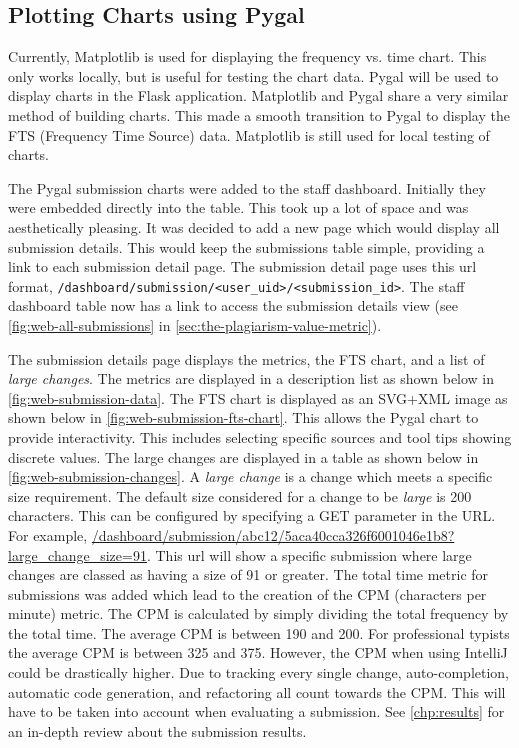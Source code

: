 \subsection{Plotting Charts using Pygal}
Currently, Matplotlib is used for displaying the frequency vs. time chart. This only works locally, but is useful for testing the chart data. Pygal will be used to display charts in the Flask application\cite{PygalFlask}. Matplotlib and Pygal share a very similar method of building charts. This made a smooth transition to Pygal to display the FTS (Frequency Time Source) data. Matplotlib is still used for local testing of charts.

The Pygal submission charts were added to the staff dashboard. Initially they were embedded directly into the table. This took up a lot of space and was aesthetically pleasing. It was decided to add a new page which would display all submission details. This would keep the submissions table simple, providing a link to each submission detail page. The submission detail page uses this url format, \texttt{/dashboard/submission/<user\_uid>/<submission\_id>}. The staff dashboard table now has a link to access the submission details view (see \autoref{fig:web-all-submissions} in \autoref{sec:the-plagiarism-value-metric}).

The submission details page displays the metrics, the FTS chart, and a list of \textit{large changes}. The metrics are displayed in a description list as shown below in \autoref{fig:web-submission-data}. The FTS chart is displayed as an SVG+XML image as shown below in \autoref{fig:web-submission-fts-chart}. This allows the Pygal chart to provide interactivity. This includes selecting specific sources and tool tips showing discrete values. The large changes are displayed in a table as shown below in \autoref{fig:web-submission-changes}. A \textit{large change} is a change which meets a specific size requirement. The default size considered for a change to be \textit{large} is 200 characters. This can be configured by specifying a GET parameter in the URL. For example, \url{/dashboard/submission/abc12/5aca40cca326f6001046e1b8?large\_change\_size=91}. This url will show a specific submission where large changes are classed as having a size of 91 or greater. The total time metric for submissions was added which lead to the creation of the CPM (characters per minute) metric. The CPM is calculated by simply dividing the total frequency by the total time. The average CPM is between 190 and 200\cite{LiveChatTypingSpeedTest}. For professional typists the average CPM is between 325 and 375. However, the CPM when using IntelliJ could be drastically higher. Due to tracking every single change, auto-completion, automatic code generation, and refactoring all count towards the CPM. This will have to be taken into account when evaluating a submission. See \autoref{chp:results} for an in-depth review about the submission results.


